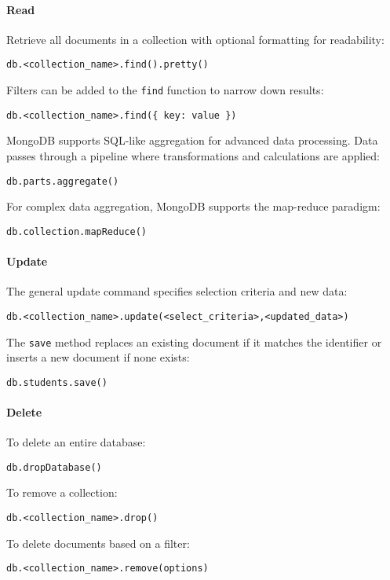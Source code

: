 \paragraph*{Read}
Retrieve all documents in a collection with optional formatting for readability:
\begin{lstlisting}[style=MongoDB]
db.<collection_name>.find().pretty()
\end{lstlisting}
Filters can be added to the \texttt{find} function to narrow down results:
\begin{lstlisting}[style=MongoDB] 
db.<collection_name>.find({ key: value }) 
\end{lstlisting}
MongoDB supports SQL-like aggregation for advanced data processing. 
Data passes through a pipeline where transformations and calculations are applied:
\begin{lstlisting}[style=MongoDB]
db.parts.aggregate()
\end{lstlisting}
For complex data aggregation, MongoDB supports the map-reduce paradigm:
\begin{lstlisting}[style=MongoDB]
db.collection.mapReduce()
\end{lstlisting}

\paragraph*{Update}
The general update command specifies selection criteria and new data:
\begin{lstlisting}[style=MongoDB]
db.<collection_name>.update(<select_criteria>,<updated_data>)
\end{lstlisting}
The \texttt{save} method replaces an existing document if it matches the identifier or inserts a new document if none exists:
\begin{lstlisting}[style=MongoDB]
db.students.save()
\end{lstlisting}

\paragraph*{Delete}
To delete an entire database:
\begin{lstlisting}[style=MongoDB]
db.dropDatabase()
\end{lstlisting}
To remove a collection:
\begin{lstlisting}[style=MongoDB]
db.<collection_name>.drop()
\end{lstlisting}
To delete documents based on a filter: 
\begin{lstlisting}[style=MongoDB]
db.<collection_name>.remove(options)
\end{lstlisting}

